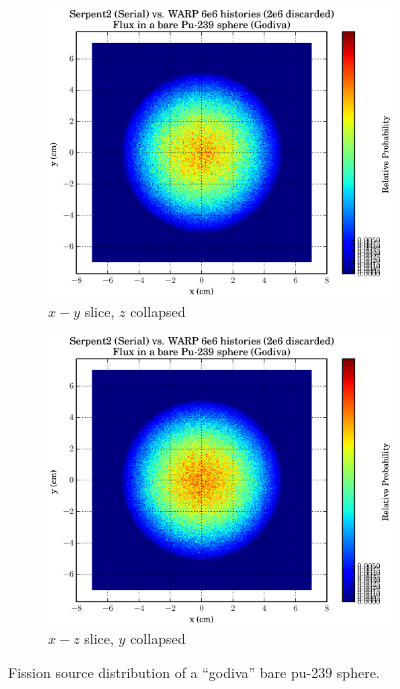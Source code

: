 \begin{figure}[h!]
\centering
\begin{subfigure}{.5\textwidth}
  \centering
  \includegraphics[width=\linewidth]{graphics/finalresults/godiva_fiss1.eps}
  \caption{$x-y$ slice, $z$ collapsed}
  \label{fig:sub1}
\end{subfigure}%
\begin{subfigure}{.5\textwidth}
  \centering
  \includegraphics[width=\linewidth]{graphics/finalresults/godiva_fiss2.eps}
  \caption{$x-z$ slice, $y$ collapsed}
  \label{fig:sub2}
\end{subfigure}
\caption{Fission source distribution of a ``godiva'' bare pu-239 sphere. \label{godiva_fiss} }
\end{figure}

